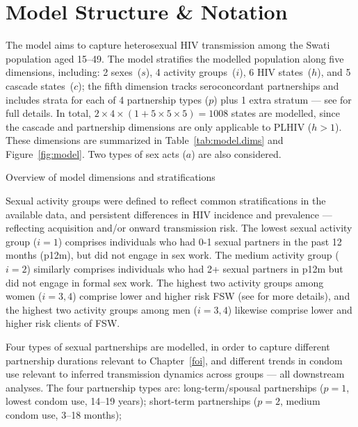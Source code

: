 \section{Model Structure \& Notation}\label{model.str}
The model aims to capture heterosexual HIV transmission among the Swati population aged 15--49.
The model stratifies the modelled population along five dimensions, including:
2 sexes~($s$), 4 activity groups~($i$), 6 HIV states~($h$), and 5 cascade states~($c$);
the fifth dimension tracks seroconcordant \hivp partnerships
and includes strata for each of 4 partnership types ($p$) plus 1 extra stratum
--- see  for full details.
In total, $2 \times 4 \times (1 + 5 \times 5 \times 5) = 1008$ states are modelled,
since the cascade and partnership dimensions are only applicable to PLHIV ($h>1$).
These dimensions are summarized in Table~\ref{tab:model.dims} and Figure~\ref{fig:model}.
Two types of sex acts ($a$) are also considered.
\begin{table}
  \centering
  \caption{Overview of model dimensions and stratifications}
  \label{tab:model.dims}
  
\end{table}
\par
Sexual activity groups were defined to reflect common stratifications in the available data,
and persistent differences in HIV incidence and prevalence
\cite{SDHS2006,Bicego2013,Justman2016,SHIMS2}
--- reflecting acquisition and/or onward transmission risk.
The lowest sexual activity group ($i=1$) comprises
individuals who had 0-1 sexual partners in the past 12 months (p12m),
but did not engage in sex work.
The medium activity group ($i=2$) similarly comprises
individuals who had 2+ sexual partners in p12m
but did not engage in formal sex work.
The highest two activity groups among women ($i=3,4$) comprise
lower and higher risk FSW (see  for more details), and
the highest two activity groups among men ($i=3,4$) likewise comprise
lower and higher risk clients of FSW.
\par
Four types of sexual partnerships are modelled,
in order to capture different partnership durations relevant to Chapter~\ref{foi},
and different trends in condom use relevant to inferred transmission dynamics across groups
--- \ie all downstream analyses.
The four partnership types are:
long-term/spousal partnerships ($p=1$, lowest condom use, 14--19 years);
short-term partnerships ($p=2$, medium condom use, 3--18 months);
